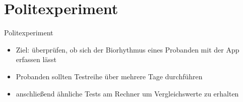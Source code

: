 \section{Politexperiment}

\begin{frame}{Politexperiment}
	\begin{itemize}[<+->]
	\item Ziel: überprüfen, ob sich der Biorhythmus eines Probanden mit der App erfassen lässt
	\item Probanden sollten Testreihe über mehrere Tage durchführen
	\item anschließend ähnliche Tests am Rechner um Vergleichswerte zu erhalten
	\end{itemize}
\end{frame}
